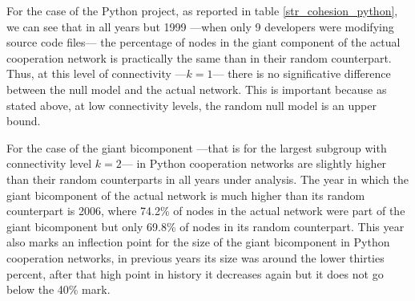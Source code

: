 For the case of the Python project, as reported in table \ref{str_cohesion_python}, we can see that in all years but 1999 ---when only 9 developers were modifying source code files--- the percentage of nodes in the giant component of the actual cooperation network is practically the same than in their random counterpart. Thus, at this level of connectivity ---$k = 1$--- there is no significative difference between the null model and the actual network. This is important because as stated above, at low connectivity levels, the random null model is an upper bound.

For the case of the giant bicomponent ---that is for the largest subgroup with connectivity level $k = 2$--- in Python cooperation networks are slightly higher than their random counterparts in all years under analysis. The year in which the giant bicomponent of the actual network is much higher than its random counterpart is 2006, where 74.2\% of nodes in the actual network were part of the giant bicomponent but only 69.8\% of nodes in its random counterpart. This year also marks an inflection point for the size of the giant bicomponent in Python cooperation networks, in previous years its size was around the lower thirties percent, after that high point in history it decreases again but it does not go below the 40\% mark. 


